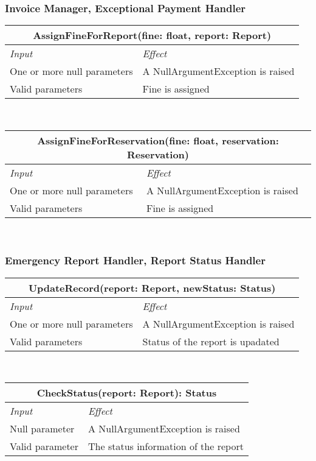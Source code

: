 		\subsubsection*{Invoice Manager, Exceptional Payment Handler}
			\begin{tabular}{ |l|l| }
				\hline
				\multicolumn{2}{|c|}{AssignFineForReport(fine: float, report: Report)}\\
				\hline 
				\textit{Input}&\textit{Effect}\\ \hline
				One or more null parameters & A NullArgumentException is raised\\ \hline
				Valid parameters & Fine is assigned \\ \hline
			\end{tabular}
			\\
			\begin{tabular}{ |l|l| }
				\hline
				\multicolumn{2}{|c|}{AssignFineForReservation(fine: float, reservation: Reservation)}\\
				\hline 
				\textit{Input}&\textit{Effect}\\ \hline
				One or more null parameters & A NullArgumentException is raised\\ \hline
				Valid parameters & Fine is assigned \\ \hline
			\end{tabular}
			\\	
			
		\subsubsection*{Emergency Report Handler, Report Status Handler}
			\begin{tabular}{ |l|l| }
				\hline
				\multicolumn{2}{|c|}{UpdateRecord(report: Report, newStatus: Status)}\\
				\hline
				\textit{Input} & \textit{Effect}\\ \hline
				One or more null parameters & A NullArgumentException is raised\\ \hline
				Valid parameters & Status of the report is upadated \\ \hline
			\end{tabular}
			\\
			\begin{tabular}{ |l|l| }
				\hline
				\multicolumn{2}{|c|}{CheckStatus(report: Report): Status}\\
				\hline
				\textit{Input} & \textit{Effect}\\ \hline
				Null parameter & A NullArgumentException is raised\\ \hline
				Valid parameter & The status information of the report\\ \hline
			\end{tabular}
			\\	
					
					
			
			